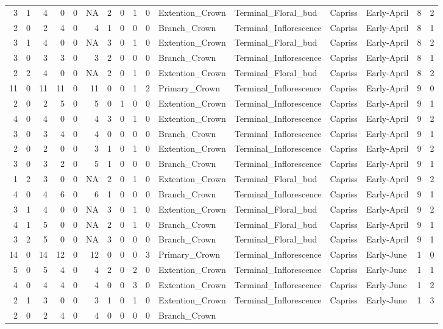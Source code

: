 \documentclass[]{article}
\begin{document}
\begin{longtable}[]{@{}rrrrrrrrrrllllrl@{}}
3 & 1 & 4 & 0 & 0 & NA & 2 & 0 & 1 & 0 & Extention\_Crown &
Terminal\_Floral\_bud & Capriss & Early-April & 8 & 2\tabularnewline
2 & 0 & 2 & 4 & 0 & 4 & 1 & 0 & 0 & 0 & Branch\_Crown &
Terminal\_Inflorescence & Capriss & Early-April & 8 & 1\tabularnewline
3 & 1 & 4 & 0 & 0 & NA & 3 & 0 & 1 & 0 & Extention\_Crown &
Terminal\_Floral\_bud & Capriss & Early-April & 8 & 2\tabularnewline
3 & 0 & 3 & 3 & 0 & 3 & 2 & 0 & 0 & 0 & Branch\_Crown &
Terminal\_Inflorescence & Capriss & Early-April & 8 & 1\tabularnewline
2 & 2 & 4 & 0 & 0 & NA & 2 & 0 & 1 & 0 & Extention\_Crown &
Terminal\_Floral\_bud & Capriss & Early-April & 8 & 2\tabularnewline
11 & 0 & 11 & 11 & 0 & 11 & 0 & 0 & 1 & 2 & Primary\_Crown &
Terminal\_Inflorescence & Capriss & Early-April & 9 & 0\tabularnewline
2 & 0 & 2 & 5 & 0 & 5 & 0 & 1 & 0 & 0 & Extention\_Crown &
Terminal\_Inflorescence & Capriss & Early-April & 9 & 1\tabularnewline
4 & 0 & 4 & 0 & 0 & 4 & 3 & 0 & 1 & 0 & Extention\_Crown &
Terminal\_Inflorescence & Capriss & Early-April & 9 & 2\tabularnewline
3 & 0 & 3 & 4 & 0 & 4 & 0 & 0 & 0 & 0 & Branch\_Crown &
Terminal\_Inflorescence & Capriss & Early-April & 9 & 1\tabularnewline
2 & 0 & 2 & 0 & 0 & 3 & 1 & 0 & 1 & 0 & Extention\_Crown &
Terminal\_Inflorescence & Capriss & Early-April & 9 & 2\tabularnewline
3 & 0 & 3 & 2 & 0 & 5 & 1 & 0 & 0 & 0 & Branch\_Crown &
Terminal\_Inflorescence & Capriss & Early-April & 9 & 1\tabularnewline
1 & 2 & 3 & 0 & 0 & NA & 2 & 0 & 1 & 0 & Extention\_Crown &
Terminal\_Floral\_bud & Capriss & Early-April & 9 & 2\tabularnewline
4 & 0 & 4 & 6 & 0 & 6 & 1 & 0 & 0 & 0 & Branch\_Crown &
Terminal\_Inflorescence & Capriss & Early-April & 9 & 1\tabularnewline
3 & 1 & 4 & 0 & 0 & NA & 3 & 0 & 1 & 0 & Extention\_Crown &
Terminal\_Floral\_bud & Capriss & Early-April & 9 & 2\tabularnewline
4 & 1 & 5 & 0 & 0 & NA & 2 & 0 & 1 & 0 & Branch\_Crown &
Terminal\_Floral\_bud & Capriss & Early-April & 9 & 1\tabularnewline
3 & 2 & 5 & 0 & 0 & NA & 3 & 0 & 0 & 0 & Branch\_Crown &
Terminal\_Floral\_bud & Capriss & Early-April & 9 & 1\tabularnewline
14 & 0 & 14 & 12 & 0 & 12 & 0 & 0 & 0 & 3 & Primary\_Crown &
Terminal\_Inflorescence & Capriss & Early-June & 1 & 0\tabularnewline
5 & 0 & 5 & 4 & 0 & 4 & 2 & 0 & 2 & 0 & Extention\_Crown &
Terminal\_Inflorescence & Capriss & Early-June & 1 & 1\tabularnewline
4 & 0 & 4 & 4 & 0 & 4 & 0 & 0 & 3 & 0 & Extention\_Crown &
Terminal\_Inflorescence & Capriss & Early-June & 1 & 2\tabularnewline
2 & 1 & 3 & 0 & 0 & 3 & 1 & 0 & 1 & 0 & Extention\_Crown &
Terminal\_Inflorescence & Capriss & Early-June & 1 & 3\tabularnewline
2 & 0 & 2 & 4 & 0 & 4 & 0 & 0 & 0 & 0 & Branch\_Crown &

\end{longtable}
\end{document}
